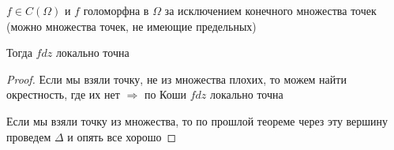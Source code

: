 \begin{consequence}\thmslashn
	
	$f\in C(\Omega)$ и $f$ голоморфна в $\Omega$ за исключением конечного множества точек (можно множества точек, не имеющие предельных)
	
	Тогда $fdz$ локально точна
	
\end{consequence}

\begin{proof}\thmslashn

	Если мы взяли точку, не из множества плохих, то можем найти окрестность, где их нет $\Rightarrow$ по Коши $fdz$ локально точна
	
	Если мы взяли точку из множества, то по прошлой теореме через эту вершину проведем $\Delta$ и опять все хорошо

\end{proof}